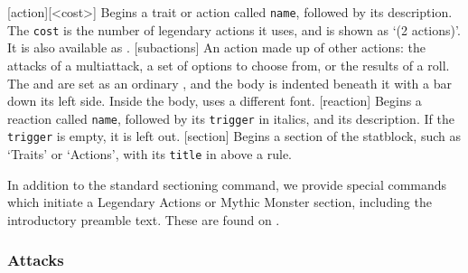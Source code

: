 			[action]{[<cost>]}
			{
				Begins a trait or action called \texttt{name}, followed by its description. The \texttt{cost} is the number of legendary actions it uses, and is shown as `(2 actions)'. It is also available as .
			}
			[subactions]{ }
			{
				An action made up of other actions: the attacks of a multiattack, a set of options to choose from, or the results of a roll. The  and  are set as an ordinary , and the body is indented beneath it with a bar down its left side. Inside the body,  uses a different font.
			}
			[reaction]{}
			{
				Begins a reaction called \texttt{name}, followed by its \texttt{trigger} in italics, and its description. If the \texttt{trigger} is empty, it is left out.
			}
			{}
			{
				Begins a section of the statblock, such as `Traits' or `Actions', with its \texttt{title} in  above a rule.
			}

			In addition to the standard sectioning command, we provide special commands which initiate a Legendary Actions or Mythic Monster section, including the introductory preamble text. These are found on .


		\subsubsection{Attacks}


